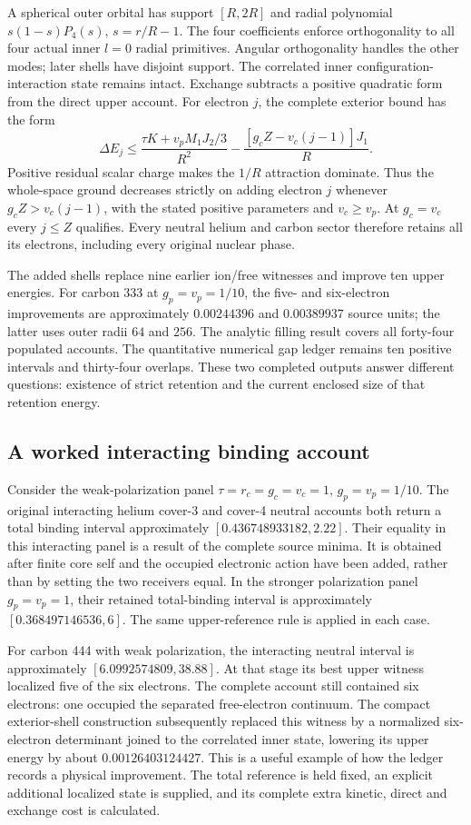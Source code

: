 A spherical outer orbital has support $[R,2R]$ and radial polynomial $s(1-s)P_4(s)$, $s=r/R-1$. The four coefficients enforce orthogonality to all four actual inner $l=0$ radial primitives. Angular orthogonality handles the other modes; later shells have disjoint support. The correlated inner configuration-interaction state remains intact. Exchange subtracts a positive quadratic form from the direct upper account. For electron $j$, the complete exterior bound has the form
\[
 \Delta E_j\leq\frac{\tau K+v_pM_1J_2/3}{R^2}
                  -\frac{[g_cZ-v_c(j-1)]J_1}{R}.
\]
Positive residual scalar charge makes the $1/R$ attraction dominate. Thus the whole-space ground decreases strictly on adding electron $j$ whenever $g_cZ>v_c(j-1)$, with the stated positive parameters and $v_c\geq v_p$. At $g_c=v_c$ every $j\leq Z$ qualifies. Every neutral helium and carbon sector therefore retains all its electrons, including every original nuclear phase.

The added shells replace nine earlier ion/free witnesses and improve ten upper energies. For carbon 333 at $g_p=v_p=1/10$, the five- and six-electron improvements are approximately $0.00244396$ and $0.00389937$ source units; the latter uses outer radii $64$ and $256$. The analytic filling result covers all forty-four populated accounts. The quantitative numerical gap ledger remains ten positive intervals and thirty-four overlaps. These two completed outputs answer different questions: existence of strict retention and the current enclosed size of that retention energy.

\subsection{A worked interacting binding account}

Consider the weak-polarization panel $\tau=r_c=g_c=v_c=1$, $g_p=v_p=1/10$. The original interacting helium cover-3 and cover-4 neutral accounts both return a total binding interval approximately $[0.436748933182,2.22]$. Their equality in this interacting panel is a result of the complete source minima. It is obtained after finite core self and the occupied electronic action have been added, rather than by setting the two receivers equal. In the stronger polarization panel $g_p=v_p=1$, their retained total-binding interval is approximately $[0.368497146536,6]$. The same upper-reference rule is applied in each case. 

For carbon 444 with weak polarization, the interacting neutral interval is approximately $[6.0992574809,38.88]$. At that stage its best upper witness localized five of the six electrons. The complete account still contained six electrons: one occupied the separated free-electron continuum. The compact exterior-shell construction subsequently replaced this witness by a normalized six-electron determinant joined to the correlated inner state, lowering its upper energy by about $0.00126403124427$. This is a useful example of how the ledger records a physical improvement. The total reference is held fixed, an explicit additional localized state is supplied, and its complete extra kinetic, direct and exchange cost is calculated. 

